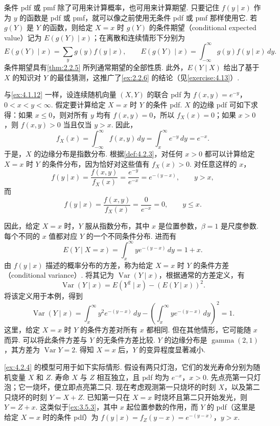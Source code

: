 条件 pdf 或 pmf 除了可用来计算概率，也可用来计算期望. 只要记住 $f(y\mid x)$ 作为 $y$ 的函数是 pdf 或 pmf，就可以像之前使用无条件 pdf 或 pmf 那样使用它. 若 $g(Y)$ 是 $Y$ 的函数，则给定 $X=x$ 时 $g(Y)$ 的条件期望（conditional expected value）记为 $E(g(Y)\mid x)$；在离散和连续情形下分别为
$$E(g(Y)\mid x)=\sum_y g(y)f(y\mid x),\qquad E(g(Y)\mid x)=\int_{-\infty}^{\infty}g(y)f(y\mid x)\,dy.$$
条件期望具有\autoref{thm:2.2.5} 所列通常期望的全部性质. 此外，$E(Y\mid X)$ 给出了基于 $X$ 的知识对 $Y$ 的最佳猜测，这推广了\autoref{ex:2.2.6} 的结论（见\autoref{exercise:4.13}）.
\begin{example}\label{ex:4.2.4}
与\autoref{ex:4.1.12} 一样，设连续随机向量 $(X,Y)$ 的联合 pdf 为 $f(x,y)=e^{-y}$，$0<x<y<\infty$. 假定要计算给定 $X=x$ 时 $Y$ 的条件 pdf. $X$ 的边缘 pdf 可如下求得：如果 $x\le0$，则对所有 $y$ 均有 $f(x,y)=0$，所以 $f_X(x)=0$；如果 $x>0$，则 $f(x,y)>0$ 当且仅当 $y>x$. 因此，
$$f_X(x)=\int_{-\infty}^{\infty}f(x,y)\,dy=\int_x^\infty e^{-y}\,dy=e^{-x}.$$
于是，$X$ 的边缘分布是指数分布. 根据\autoref{def:4.2.3}，对任何 $x>0$ 都可以计算给定 $X=x$ 时 $Y$ 的条件分布，因为恰好对这些值有 $f_X(x)>0$. 对任意这样的 $x$，
$$f(y\mid x)=\frac{f(x,y)}{f_X(x)}=\frac{e^{-y}}{e^{-x}}=e^{-(y-x)},\qquad y>x,$$
而
$$f(y\mid x)=\frac{f(x,y)}{f_X(x)}=\frac0{e^{-x}}=0,\qquad y\le x.$$

因此，给定 $X=x$ 时，$Y$ 服从指数分布，其中 $x$ 是位置参数，$\beta=1$ 是尺度参数. 每个不同的 $x$ 值都对应 $Y$ 的一个不同条件分布. 进而有
$$E(Y\mid X=x)=\int_x^\infty ye^{-(y-x)}\,dy=1+x.$$
由 $f(y\mid x)$ 描述的概率分布的方差，称为给定 $X=x$ 时 $Y$ 的条件方差（conditional variance）. 将其记为 $\operatorname{Var}(Y\mid x)$，根据通常的方差定义，有
$$\operatorname{Var}(Y\mid x)=E(Y^2\mid x)-(E(Y\mid x))^2.$$
将该定义用于本例，得到
$$\operatorname{Var}(Y\mid x)=\int_x^\infty y^2e^{-(y-x)}\,dy-\left(\int_x^\infty ye^{-(y-x)}\,dy\right)^2=1.$$
这里，给定 $X=x$ 时 $Y$ 的条件方差对所有 $x$ 都相同. 但在其他情形，它可能随 $x$ 而异. 可以将此条件方差与 $Y$ 的无条件方差比较. $Y$ 的边缘分布是 $\operatorname{gamma}(2,1)$，其方差为 $\operatorname{Var}Y=2$. 得知 $X=x$ 后，$Y$ 的变异程度显著减小.
\end{example}

\autoref{ex:4.2.4} 的模型可用于如下实际情形. 假设有两只灯泡，它们的发光寿命分别为随机变量 $X$ 和 $Z$. 寿命 $X$ 与 $Z$ 相互独立，且 pdf 均为 $e^{-x}$，$x>0$. 先点亮第一只灯泡；它一烧坏，便立即点亮第二只. 现在考虑观测第一只烧坏的时刻 $X$，以及第二只烧坏的时刻 $Y=X+Z$. 已知第一只在 $X=x$ 时烧坏且第二只开始发光，则 $Y=Z+x$. 这类似于\autoref{ex:3.5.3}，其中 $x$ 起位置参数的作用，而 $Y$ 的 pdf（这里是给定 $X=x$ 时的条件 pdf）为 $f(y\mid x)=f_Z(y-x)=e^{-(y-x)}$，$y>x$.


